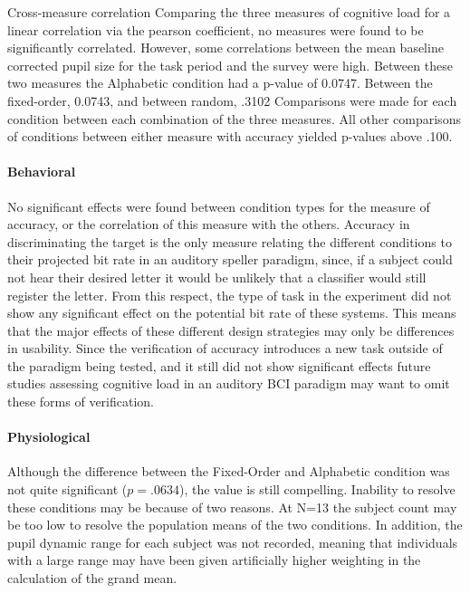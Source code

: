 \documentclass[12pt]{article}
\begin{document}
Cross-measure correlation
Comparing the three measures of cognitive load for a linear
correlation via the pearson coefficient, no measures were found to
be significantly correlated. However, some correlations between the
mean baseline corrected pupil size for the task period and the survey were high.
Between these two measures the Alphabetic condition had a p-value
of 0.0747.  Between the fixed-order, 0.0743, and between random, .3102
Comparisons were made for each condition
between each combination of the three measures.  All other
comparisons of conditions between either measure with accuracy yielded
p-values above .100.


\paragraph{Behavioral}
No significant effects were found between condition types for the
measure of accuracy, or the correlation of this measure with the
others.  Accuracy in discriminating the target is the only measure
relating the different conditions to their projected bit rate in an
auditory speller paradigm, since, if a subject could not hear their desired
letter it would be unlikely that a classifier would still
register the letter. From this respect, the type of task in the
experiment did not show any significant effect on the potential bit rate of
these systems. This means that the major effects of these different
design strategies may only be differences in usability. Since the
verification of accuracy introduces a new task outside of the
paradigm being tested, and it still did not show significant effects
future studies assessing cognitive load in an auditory BCI paradigm
may want to omit these forms of verification.

\paragraph{Physiological}
Although the difference between the Fixed-Order and Alphabetic
condition was not quite significant ($p=.0634$), the value is
still compelling.  Inability to resolve these conditions may be
because of two reasons.  At N=13 the subject count may be too low to
resolve the population means of the two conditions. In addition, the
pupil dynamic range for each subject was not recorded, meaning that
individuals with a large range may have been given artificially higher
weighting in the calculation of the grand mean.
\end{document}
